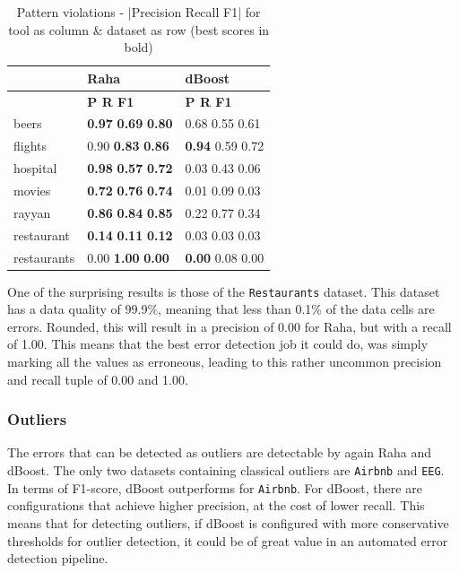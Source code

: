 \begin{table}[H]
\centering
\caption{Pattern violations - |Precision Recall F1| for tool as column \& dataset as row (best scores in bold)}
\begin{adjustbox}{center}
\begin{tabular}{lll}
\toprule
{} & Raha & dBoost \\
\midrule
 & \textbf{\space\space\space P \space\space\space\space R \space\space\space F1} & \textbf{\space\space\space P \space\space\space\space R \space\space\space F1} \\
beers & \textbf{0.97} \textbf{0.69} \textbf{0.80} & 0.68 0.55 0.61 \\
flights & 0.90 \textbf{0.83} \textbf{0.86} & \textbf{0.94} 0.59 0.72 \\
hospital & \textbf{0.98} \textbf{0.57} \textbf{0.72} & 0.03 0.43 0.06 \\
movies & \textbf{0.72} \textbf{0.76} \textbf{0.74} & 0.01 0.09 0.03 \\
rayyan & \textbf{0.86} \textbf{0.84} \textbf{0.85} & 0.22 0.77 0.34 \\
restaurant & \textbf{0.14} \textbf{0.11} \textbf{0.12} & 0.03 0.03 0.03 \\
restaurants & 0.00 \textbf{1.00} \textbf{0.00} & \textbf{0.00} 0.08 0.00 \\
\bottomrule
\end{tabular}
\end{adjustbox}
\end{table}

One of the surprising results is those of the \verb|Restaurants| dataset. This dataset has a data quality of 99.9\%, meaning that less than 0.1\% of the data cells are errors. Rounded, this will result in a precision of 0.00 for Raha, but with a recall of 1.00. This means that the best error detection job it could do, was simply marking all the values as erroneous, leading to this rather uncommon precision and recall tuple of 0.00 and 1.00. 

\subsubsection{Outliers}
The errors that can be detected as outliers are detectable by again Raha and dBoost. The only two datasets containing classical outliers are \verb|Airbnb| and \verb|EEG|. In terms of F1-score, dBoost outperforms for \verb|Airbnb|. For dBoost, there are configurations that achieve higher precision, at the cost of lower recall. This means that for detecting outliers, if dBoost is configured with more conservative thresholds for outlier detection, it could be of great value in an automated error detection pipeline. 

